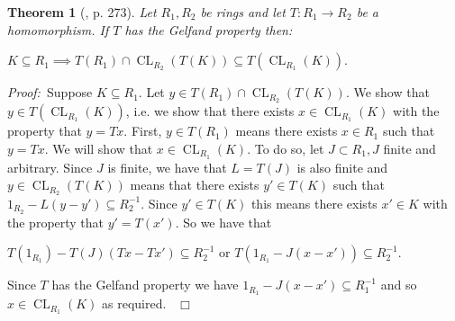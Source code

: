 \documentclass[12pt, oneside]{book}
\newtheorem{theorem}{Theorem}[subsection]
\newcommand{\proof}{{\noindent \it Proof:~}}
\newcommand{\qed}{\hfill ~$\Box$\\}
\def\CL{\operatorname{CL}}
\begin{document}
\begin{theorem}[\cite{CH3}, p. 273] \label{GelfandP}
\normalfont
\noindent Let $R_1, R_2$ be rings and let $T: R_1 \rightarrow R_2$ be a homomorphism. 
If $T$ has the Gelfand property then:
\begin{center}
$K \subseteq R_1 \implies T(R_1) \cap \CL_{R_2}(T(K)) \subseteq T(\CL_{R_1}(K)).$
\end{center} 
\end{theorem}
\proof \space Suppose $K \subseteq R_1$. Let $y \in T(R_1) \cap \CL_{R_2}(T(K)).$ We show 
that $y \in T(\CL_{R_1}(K))$, i.e. we show that there exists $x \in \CL_{R_1}(K)$ with the 
property that $y = Tx$. First, $y \in T(R_1)$ means there exists $x \in R_1$ such that $y = Tx$. 
We will show that $x \in \CL_{R_1}(K)$. To do so, let $J \subset R_1, J$ finite and arbitrary. 
Since $J$ is finite, we have that $L = T(J)$ is also finite and $y \in \CL_{R_2}(T(K))$ means 
that there exists $y' \in T(K)$ such that $1_{R_2} - L(y - y') \subseteq R_2^{-1}.$ 
Since $y' \in T(K)$ this means there exists $x' \in K$ with the property that $y' = T(x')$. 
So we have that 
\begin{center}
$T(1_{R_1}) - T(J)(Tx - Tx') \subseteq R_2^{-1}$ or $T(1_{R_1} - J(x - x')) \subseteq R_2^{-1}.$
\end{center}
Since $T$ has the Gelfand property we have $1_{R_1} - J(x - x') \subseteq R^{-1}_1$
and so $x \in \CL_{R_1}(K)$ as required. \qed

\vskip 0.3cm
\end{document}
